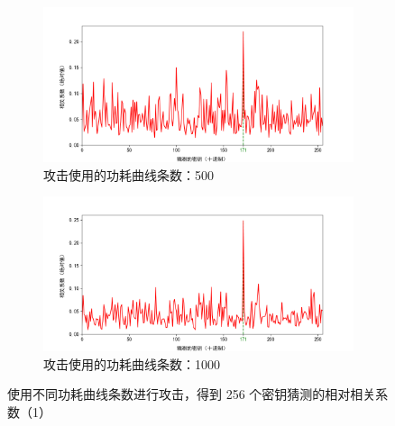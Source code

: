 \begin{figure}[htbp]
\begin{subfigure}{1.0\textwidth}
    \end{subfigure}
    \begin{subfigure}{1.0\textwidth}
        \includegraphics[height=.21\textheight, width=1.0\textwidth]{../images/keyguess_500.png}
        \caption{攻击使用的功耗曲线条数：500}
    \end{subfigure}
    \begin{subfigure}{1.0\textwidth}
        \includegraphics[height=.21\textheight, width=1.0\textwidth]{../images/keyguess_1000.png}
        \caption{攻击使用的功耗曲线条数：1000}
    \end{subfigure}
    \caption{使用不同功耗曲线条数进行攻击，得到 256 个密钥猜测的相对相关系数（1）}
    \label{fig:keyguess}
\end{figure}
 
